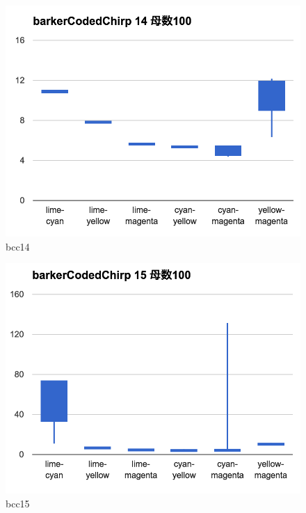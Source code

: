 \begin{figure}[p]
  \centering
  \includegraphics[clip,width=1.05\hsize]{img/bcc14.png}
  \caption{bcc14}\label{fig:bcc14}
\end{figure}

\begin{figure}[p]
  \centering
  \includegraphics[clip,width=1.05\hsize]{img/bcc15.png}
  \caption{bcc15}\label{fig:bcc15}
\end{figure}


\clearpage



